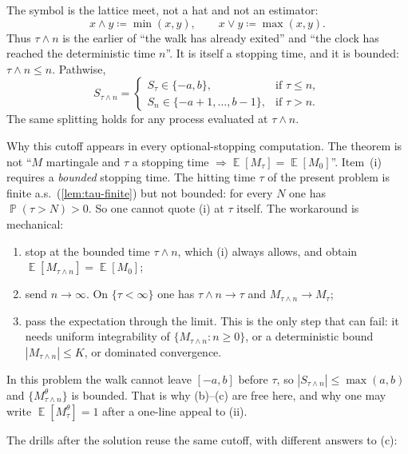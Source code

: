 \documentclass[11pt,a4paper]{article}
\DeclareMathOperator{\E}{\mathbb{E}}
\DeclareMathOperator{\Pbb}{\mathbb{P}}
\begin{document}
\begin{remark}
\label{rem:tau-wedge-n}
The symbol is the lattice meet, not a hat and not an estimator:
\[
x\wedge y
\coloneqq
\min(x,y),
\qquad
x\vee y
\coloneqq
\max(x,y).
\]
Thus \( \tau\wedge n \) is the earlier of ``the walk has already exited'' and ``the clock has reached the deterministic time \( n \)''. It is itself a stopping time, and it is bounded: \( \tau\wedge n\le n \). Pathwise,
\[
S_{\tau\wedge n}
=
\begin{cases}
S_{\tau}\in\{-a,b\},
&
\text{if }\tau\le n,\\
S_n\in\{-a+1,\dots,b-1\},
&
\text{if }\tau>n.
\end{cases}
\]
The same splitting holds for any process evaluated at \( \tau\wedge n \).

Why this cutoff appears in every optional-stopping computation. The theorem is not ``\( M \) martingale and \( \tau \) a stopping time \( \Rightarrow\E[M_{\tau}]=\E[M_0] \)''. Item~(i) requires a \emph{bounded} stopping time. The hitting time \( \tau \) of the present problem is finite a.s.\ (\cref{lem:tau-finite}) but not bounded: for every \( N \) one has \( \Pbb(\tau>N)>0 \). So one cannot quote (i) at \( \tau \) itself. The workaround is mechanical:

\begin{enumerate}[label=\textup{(\alph*)}]
    \item
    stop at the bounded time \( \tau\wedge n \), which (i) always allows, and obtain \( \E[M_{\tau\wedge n}]=\E[M_0] \);
    \item
    send \( n\to\infty \). On \( \{\tau<\infty\} \) one has \( \tau\wedge n\to\tau \) and \( M_{\tau\wedge n}\to M_{\tau} \);
    \item
    pass the expectation through the limit. This is the only step that can fail: it needs uniform integrability of \( \{M_{\tau\wedge n}:n\ge 0\} \), or a deterministic bound \( |M_{\tau\wedge n}|\le K \), or dominated convergence.
\end{enumerate}

In this problem the walk cannot leave \( [-a,b] \) before \( \tau \), so \( |S_{\tau\wedge n}|\le\max(a,b) \) and \( \{M_{\tau\wedge n}^{\theta}\} \) is bounded. That is why (b)--(c) are free here, and why one may write \( \E[M_{\tau}^{\theta}]=1 \) after a one-line appeal to (ii).

The drills after the solution reuse the same cutoff, with different answers to (c):


\end{remark}
\end{document}

